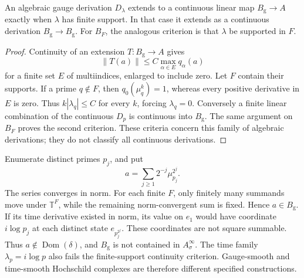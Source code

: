 \begin{proposition}
\label{v4-arith:bc:gauge-continuity}
An algebraic gauge derivation \(D_\lambda\) extends to a continuous
linear map \(B_{\mathrm g}\to A\) exactly when \(\lambda\) has
finite support. In that case it extends as a continuous derivation
\(B_{\mathrm g}\to B_{\mathrm g}\). For \(B_F\), the analogous
criterion is that \(\lambda\) be supported in \(F\).
\end{proposition}
\begin{proof}
Continuity of an extension \(T:B_{\mathrm g}\to A\) gives
\[
 \|T(a)\|\le C\max_{\alpha\in E}q_\alpha(a)
\]
for a finite set \(E\) of multiindices, enlarged to include zero.
Let \(F\) contain their supports. If a prime \(q\notin F\), then
\(q_0(\mu_q^k)=1\), whereas every positive derivative in \(E\)
is zero. Thus \(k|\lambda_q|\le C\) for every \(k\), forcing
\(\lambda_q=0\). Conversely a finite linear combination of the
continuous \(D_p\) is continuous into \(B_{\mathrm g}\).
The same argument on \(B_F\) proves the second criterion.
These criteria concern this family of algebraic derivations;
they do not classify all continuous derivations.
\end{proof}

\begin{example}
Enumerate distinct primes \(p_j\), and put
\[
 a=\sum_{j\ge1}2^{-j}\mu_{p_j}^{2^j}.
\]
The series converges in norm. For each finite \(F\), only finitely
many summands move under \(\mathbb T^F\), while the remaining
norm-convergent sum is fixed. Hence \(a\in B_{\mathrm g}\).
If its time derivative existed in norm, its value on \(e_1\)
would have coordinate \(i\log p_j\) at each distinct state
\(e_{p_j^{2^j}}\). These coordinates are not square summable.
Thus \(a\notin\operatorname{Dom}(\delta)\), and
\(B_{\mathrm g}\) is not contained in \(A_\sigma^\infty\).
The time family \(\lambda_p=i\log p\) also fails the finite-support
continuity criterion. Gauge-smooth and time-smooth Hochschild
complexes are therefore different specified constructions.
\end{example}


